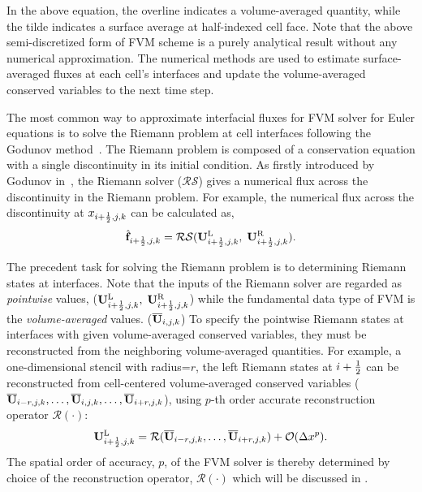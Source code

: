 In the above equation, the overline indicates a volume-averaged quantity,
while the tilde indicates a surface average at half-indexed cell face.
Note that the above semi-discretized form of FVM scheme is a purely analytical result
without any numerical approximation. The numerical methods are used to estimate
surface-averaged fluxes at each cell's interfaces and
update the volume-averaged conserved variables to the next time step.

The most common way to approximate interfacial fluxes for FVM solver for Euler equations is to solve
the Riemann problem at cell interfaces following the Godunov method~\cite{godunov1959difference}.
The Riemann problem is composed of a conservation equation with a single discontinuity
in its initial condition. As firstly introduced by Godunov in~\cite{godunov1959difference},
the Riemann solver (\( \mathcal{RS} \)) gives a numerical flux across the discontinuity in the Riemann problem.
For example, the numerical flux across the discontinuity at \( x_{{i+\frac{1}{2}},j,k} \)
can be calculated as,
\begin{equation}\label{eq:riemann_solver}
    \hat{\mathbf{f}}_{{i+\frac{1}{2}},j,k} = \mathcal{RS}(\mathbf{U}^{\text{L}}_{{i+\frac{1}{2}},j,k}, \; \mathbf{U}^{\text{R}}_{{i+\frac{1}{2}},j,k}).
\end{equation}

The precedent task for solving the Riemann problem is to determining Riemann states at interfaces.
Note that the inputs of the Riemann solver are regarded as \textit{pointwise} values, (\( \mathbf{U}^{\text{L}}_{{i+\frac{1}{2}},j,k}, \; \mathbf{U}^{\text{R}}_{{i+\frac{1}{2}},j,k} \))
while the fundamental data type of FVM is the \textit{volume-averaged} values. (\( \overline{\mathbf{U}}_{i,j,k} \))
To specify the pointwise Riemann states at interfaces with given volume-averaged conserved variables,
they must be reconstructed from the neighboring volume-averaged quantities.
For example, a one-dimensional stencil with radius=\( r \),
the left Riemann states at \( i + \frac{1}{2} \) can be reconstructed from
cell-centered volume-averaged conserved variables (\( \overline{\mathbf{U}}_{i-r,j,k}, \dots, \overline{\mathbf{U}}_{i,j,k}, \dots, \overline{\mathbf{U}}_{i+r,j,k} \)),
using \( p \)-th order accurate reconstruction operator \( \mathcal{R}(\cdot) \):
\begin{equation}\label{eq:fvm_recon}
    \mathbf{U}^{\text{L}}_{{i+\frac{1}{2}},j,k} = \mathcal{R}(\overline{\mathbf{U}}_{i-r,j,k}, \dots, \overline{\mathbf{U}}_{i+r,j,k}) + \mathcal{O} (\Delta x^{p}).
\end{equation}
The spatial order of accuracy, \( p \), of the FVM solver is thereby determined by choice of the reconstruction operator, \( \mathcal{R}(\cdot) \)
which will be discussed in .

